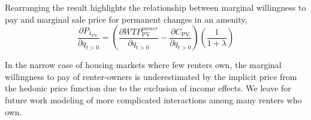 \documentclass[ecta,nameyear,draft]{econsocart}
\theoremstyle{plain}
\theoremstyle{remark}
\begin{document}
Rearranging the result highlights the relationship between marginal willingness to pay and marginal sale price for permanent changes in an amenity,
\begin{equation}
	\frac{\partial P_{1_{\mathrm{PV}}}} {\partial q_{t>0}}=\left(
	\frac{\partial \mathit{WTP}^{\mathit{owner}}_{\mathrm{PV}}}{\partial q_{t>0}}-\frac{\partial C_{\mathrm{PV}}}{\partial q_{t>0}}\right)\left(\frac{1}{1+\lambda}\right) \label{marginalPriceOwner}
\end{equation}

In the narrow case of housing markets where few renters own, the marginal willingness to pay of renter-owners is underestimated by the implicit price from the hedonic price function due to the exclusion of income effects. We leave for future work modeling of more complicated interactions among many renters who own.
\end{document}
